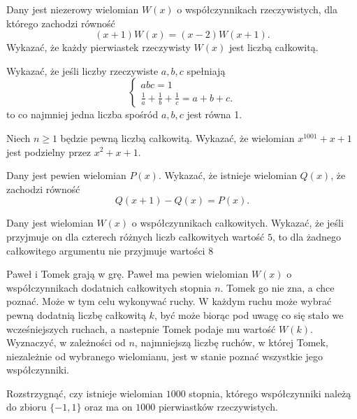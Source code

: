 \begin{problem}{1}
	Dany jest niezerowy wielomian $W(x)$ o współczynnikach rzeczywistych, dla którego zachodzi równość
	\[
		(x + 1)W(x) = (x - 2)W(x + 1).
	\]
	Wykazać, że każdy pierwiastek rzeczywisty $W(x)$ jest liczbą całkowitą.
\end{problem}


\begin{problem}{2}
	Wykazać, że jeśli liczby rzeczywiste $a, b, c$ spełniają
    \[
    \begin{cases}
        abc = 1 \\
        \frac{1}{a} + \frac{1}{b} + \frac{1}{c} = a + b + c.
    \end{cases}
    \]
    to co najmniej jedna liczba spośród $a, b, c$ jest równa 1.
\end{problem}

\begin{problem}{3}
	Niech $n \geqslant 1$ będzie pewną liczbą całkowitą. Wykazać, że wielomian $x^{1001} + x + 1$ jest podzielny przez $x^2 + x + 1$.
\end{problem}


\begin{problem}{4}
	Dany jest pewien wielomian $P(x)$. Wykazać, że istnieje wielomian $Q(x)$, że zachodzi równość
	\[
		Q(x + 1) - Q(x) = P(x).
	\]
\end{problem}

\begin{problem}{5}
	Dany jest wielomian $W(x)$ o współczynnikach całkowitych. Wykazać, że jeśli przyjmuje on dla czterech różnych liczb całkowitych wartość $5$, to dla żadnego całkowitego argumentu nie przyjmuje wartości $8$
\end{problem}


\begin{problem}{6}
	Paweł i Tomek grają w grę.
	Paweł ma pewien wielomian $W(x)$ o współczynnikach dodatnich całkowitych stopnia $n$. Tomek go nie zna, a chce poznać. Może w tym celu wykonywać ruchy. W każdym ruchu może wybrać pewną dodatnią liczbę całkowitą $k$, być może biorąc pod uwagę co się stało we wcześniejszych ruchach, a nastepnie Tomek podaje mu wartość $W(k)$. Wyznaczyć, w zależności od $n$, najmniejszą liczbę ruchów, w której Tomek, niezależnie od wybranego wielomianu, jest w stanie poznać wszystkie jego współczynniki.
\end{problem}

\begin{problem}{7}
	Rozstrzygnąć, czy istnieje wielomian $1000$ stopnia, którego współczynniki należą do zbioru $\{-1, 1\}$ oraz ma on $1000$ pierwiastków rzeczywistych.
\end{problem}

